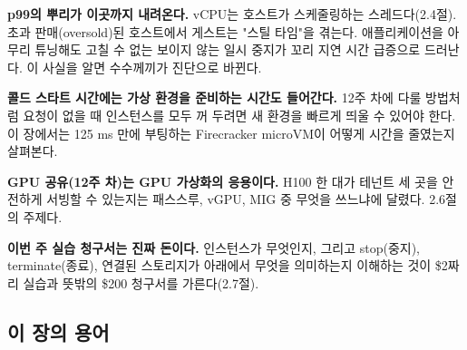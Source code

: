 \begin{tbbitemize}
  \item \textbf{p99의 뿌리가 이곳까지 내려온다.} vCPU는 호스트가 스케줄링하는 스레드다(2.4절). 초과 판매(oversold)된 호스트에서 게스트는 "스틸 타임"을 겪는다. 애플리케이션을 아무리 튜닝해도 고칠 수 없는 보이지 않는 일시 중지가 꼬리 지연 시간 급증으로 드러난다. 이 사실을 알면 수수께끼가 진단으로 바뀐다.
  \item \textbf{콜드 스타트 시간에는 가상 환경을 준비하는 시간도 들어간다.} 12주 차에 다룰 방법처럼 요청이 없을 때 인스턴스를 모두 꺼 두려면 새 환경을 빠르게 띄울 수 있어야 한다. 이 장에서는 125 ms 만에 부팅하는 Firecracker microVM이 어떻게 시간을 줄였는지 살펴본다.
  \item \textbf{GPU 공유(12주 차)는 GPU 가상화의 응용이다.} H100 한 대가 테넌트 세 곳을 안전하게 서빙할 수 있는지는 패스스루, vGPU, MIG 중 무엇을 쓰느냐에 달렸다. 2.6절의 주제다.
  \item \textbf{이번 주 실습 청구서는 진짜 돈이다.} 인스턴스가 무엇인지, 그리고 stop(중지), terminate(종료), 연결된 스토리지가 아래에서 무엇을 의미하는지 이해하는 것이 \$2짜리 실습과 뜻밖의 \$200 청구서를 가른다(2.7절).
\end{tbbitemize}

\subsection*{이 장의 용어}

